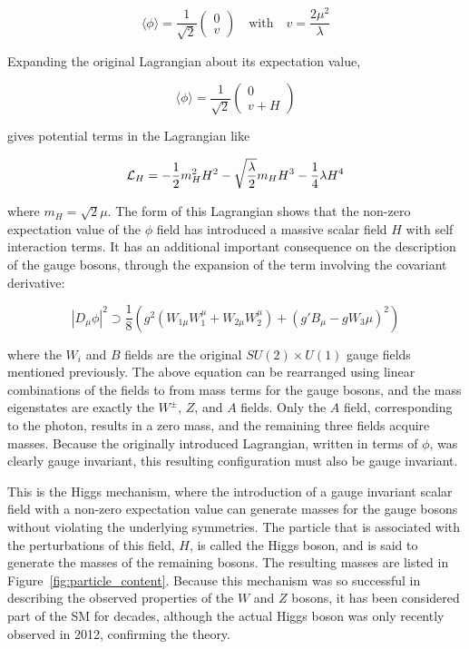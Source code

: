 \begin{equation}
 \langle \phi \rangle = \frac{1}{\sqrt{2}} \begin{pmatrix}0\\v\end{pmatrix} \quad \mathrm{with} \quad v = \frac{2\mu^2}{\lambda}
\end{equation}

\noindent Expanding the original Lagrangian about its expectation value, 

\begin{equation}
  \langle \phi \rangle = \frac{1}{\sqrt{2}} \begin{pmatrix}0\\v + H\end{pmatrix}
\end{equation}

\noindent gives potential terms in the Lagrangian like 

\begin{equation}
  \mathcal{L}_{H} = -\frac{1}{2}m_H^2 H^2 - \sqrt{\frac{\lambda}{2}}m_H H^3 - \frac{1}{4}\lambda H^4
\end{equation}

\noindent where $m_H = \sqrt{2}\mu$.
The form of this Lagrangian shows that the non-zero expectation value of the $\phi$ field has introduced a massive scalar field $H$ with self interaction terms.
It has an additional important consequence on the description of the gauge bosons, through the expansion of the term involving the covariant derivative:

\begin{equation}
  |D_\mu\phi|^2 \supset \frac{1}{8}\left(g^2(W_{1\mu}W_1^\mu + W_{2\mu}W_2^\mu) + (g'B_\mu - gW_3{\mu})^2\right)
\end{equation}

where the $W_i$ and $B$ fields are the original $SU(2)\times U(1)$ gauge fields mentioned previously.
The above equation can be rearranged using linear combinations of the fields to from mass terms for the gauge bosons, and the mass eigenstates are exactly the $W^\pm$, $Z$, and $A$ fields.
Only the $A$ field, corresponding to the photon, results in a zero mass, and the remaining three fields acquire masses.
Because the originally introduced Lagrangian, written in terms of $\phi$, was clearly gauge invariant, this resulting configuration must also be gauge invariant.

This is the Higgs mechanism, where the introduction of a gauge invariant scalar field with a non-zero expectation value can generate masses for the gauge bosons without violating the underlying symmetries.
The particle that is associated with the perturbations of this field, $H$, is called the Higgs boson, and is said to generate the masses of the remaining bosons.
The resulting masses are listed in Figure~\ref{fig:particle_content}.
Because this mechanism was so successful in describing the observed properties of the $W$ and $Z$ bosons, it has been considered part of the \ac{SM} for decades, although the actual Higgs boson was only recently observed in 2012, confirming the theory.

